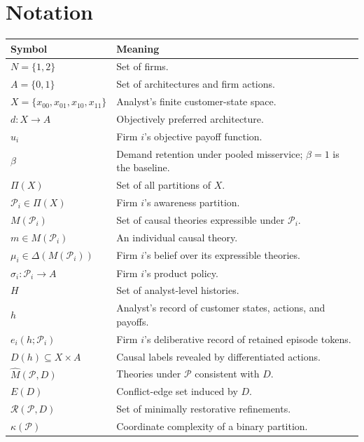 \documentclass[11pt]{article}
\begin{document}
\section{Notation}

\begin{center}
\renewcommand{\arraystretch}{1.15}
\begin{tabularx}{\textwidth}{@{}>{\raggedright\arraybackslash}p{}X@{}}
\toprule
\textbf{Symbol} & \textbf{Meaning} \\
\midrule
$N=\{1,2\}$ & Set of firms. \\
$A=\{0,1\}$ & Set of architectures and firm actions. \\
$X=\{x_{00},x_{01},x_{10},x_{11}\}$ & Analyst's finite customer-state space. \\
$d:X\to A$ & Objectively preferred architecture. \\
$u_i$ & Firm $i$'s objective payoff function. \\
$\beta$ & Demand retention under pooled misservice; $\beta=1$ is the baseline. \\
$\Pi(X)$ & Set of all partitions of $X$. \\
$\mathcal P_i\in\Pi(X)$ & Firm $i$'s awareness partition. \\
$M(\mathcal P_i)$ & Set of causal theories expressible under $\mathcal P_i$. \\
$m\in M(\mathcal P_i)$ & An individual causal theory. \\
$\mu_i\in\Delta(M(\mathcal P_i))$ & Firm $i$'s belief over its expressible theories. \\
$\sigma_i:\mathcal P_i\to A$ & Firm $i$'s product policy. \\
$H$ & Set of analyst-level histories. \\
$h$ & Analyst's record of customer states, actions, and payoffs. \\
$e_i(h;\mathcal P_i)$ & Firm $i$'s deliberative record of retained episode tokens. \\
$D(h)\subseteq X\times A$ & Causal labels revealed by differentiated actions. \\
$\widehat M(\mathcal P,D)$ & Theories under $\mathcal P$ consistent with $D$. \\
$E(D)$ & Conflict-edge set induced by $D$. \\
$\mathcal R(\mathcal P,D)$ & Set of minimally restorative refinements. \\
$\kappa(\mathcal P)$ & Coordinate complexity of a binary partition. \\

\end{tabularx}
\end{center}
\end{document}
